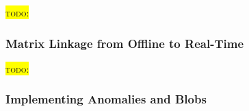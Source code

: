 \documentclass[11pt,a4paper]{article}
\newcommand{\todo}[1]{\colorbox{yellow}{\textsc{todo}: #1}}
\begin{document}
\todo{}

\subsubsection{Matrix Linkage from Offline to Real-Time}

\todo{}

\subsubsection{Implementing Anomalies and Blobs}

\end{document}
